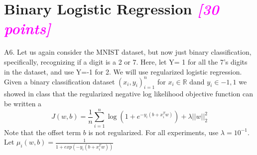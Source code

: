 \documentclass{article}
\newcommand{\field}[1]{\mathbb{#1}}
\newcommand{\1}{\mathbf{1}}
\newcommand{\R}{\field{R}} %
\newcommand{\points}[1]{\small\textcolor{magenta}{\emph{[#1 points]}} \normalsize}
\begin{document}
\section*{Binary Logistic Regression \points{30}}
A6. Let us again consider the MNIST dataset, but now just binary classification, specifically, recognizing if a digit is a 2 or 7. Here, let Y= 1 for all the 7’s digits in the dataset, and use Y=-1 for 2. We will use regularized logistic regression.  Given a binary classification dataset ${(x_i,y_i)}^n_{i=1}$ for $x_i\in\R$ dand $y_i\in {-1,1}$ we showed in class that the regularized negative log likelihood objective function can be written a
$$J(w,b) = \frac{1}{n} \sum_{i=1}^n \log{\left( 1 + e^{-y_i(b+x^T_iw)} \right)} + \lambda||w||^2_2$$
Note that the offset term $b$ is not regularized. For all experiments, use $\lambda = 10^{-1}$. Let $\mu_i(w,b) = \frac{1}{1+exp(-y_i(b+x^T_iw))}$
\end{document}
